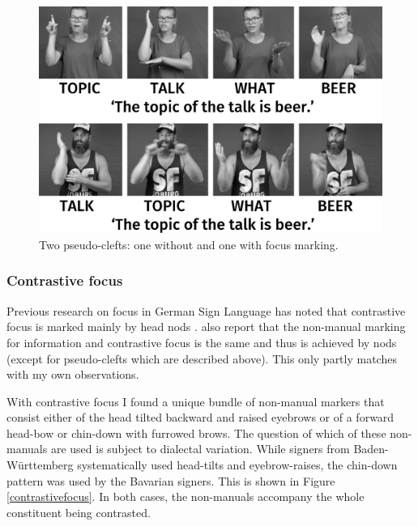 \begin{figure}[bt]
\centering
	\includegraphics[width=1.0\textwidth]{pseudoclefttwosw.jpg}
	\caption{Two pseudo-clefts: one without and one with focus marking.}
	\label{pseudocleft}
\end{figure}

\subsubsection{Contrastive focus}\label{contrastivefocussubection}
Previous research on focus in German Sign Language has noted that contrastive focus is marked mainly by head nods \citep{waleschkowski2009}. \citet[402--403]{happ2014vork} also report that the non-manual marking for information and contrastive focus is the same and thus is achieved by nods (except for pseudo-clefts which are described above). This only partly matches with my own observations. 

With contrastive focus I found a unique bundle of non-manual markers that consist either of the head tilted backward and raised eyebrows or of a forward head-bow or chin-down with furrowed brows. The question of which of these non-manuals are used is subject to dialectal variation. While signers from Baden-Württemberg systematically used head-tilts and eyebrow-raises, the chin-down pattern was used by the Bavarian signers. This is shown in Figure \ref{contrastivefocus}. In both cases, the non-manuals accompany the whole constituent being contrasted.

